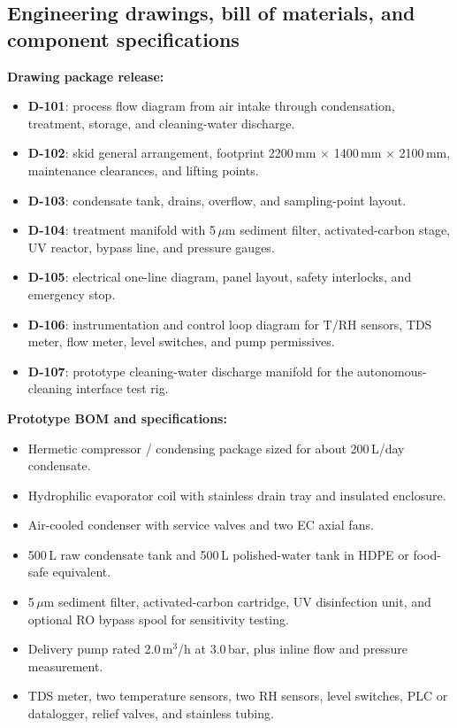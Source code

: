 \documentclass[11pt,a4paper]{article}
\begin{document}
\subsection{Engineering drawings, bill of materials, and component specifications}
\textbf{Drawing package release:}
\begin{itemize}[leftmargin=*]
  \item \textbf{D-101}: process flow diagram from air intake through condensation, treatment, storage, and cleaning-water discharge.
  \item \textbf{D-102}: skid general arrangement, footprint 2200\,mm $\times$ 1400\,mm $\times$ 2100\,mm, maintenance clearances, and lifting points.
  \item \textbf{D-103}: condensate tank, drains, overflow, and sampling-point layout.
  \item \textbf{D-104}: treatment manifold with 5\,$\mu$m sediment filter, activated-carbon stage, UV reactor, bypass line, and pressure gauges.
  \item \textbf{D-105}: electrical one-line diagram, panel layout, safety interlocks, and emergency stop.
  \item \textbf{D-106}: instrumentation and control loop diagram for T/RH sensors, TDS meter, flow meter, level switches, and pump permissives.
  \item \textbf{D-107}: prototype cleaning-water discharge manifold for the autonomous-cleaning interface test rig.
\end{itemize}

\textbf{Prototype BOM and specifications:}
\begin{itemize}[leftmargin=*]
  \item Hermetic compressor / condensing package sized for about 200\,L/day condensate.
  \item Hydrophilic evaporator coil with stainless drain tray and insulated enclosure.
  \item Air-cooled condenser with service valves and two EC axial fans.
  \item 500\,L raw condensate tank and 500\,L polished-water tank in HDPE or food-safe equivalent.
  \item 5\,$\mu$m sediment filter, activated-carbon cartridge, UV disinfection unit, and optional RO bypass spool for sensitivity testing.
  \item Delivery pump rated 2.0\,m$^3$/h at 3.0\,bar, plus inline flow and pressure measurement.
  \item TDS meter, two temperature sensors, two RH sensors, level switches, PLC or datalogger, relief valves, and stainless tubing.
\end{itemize}
\end{document}
